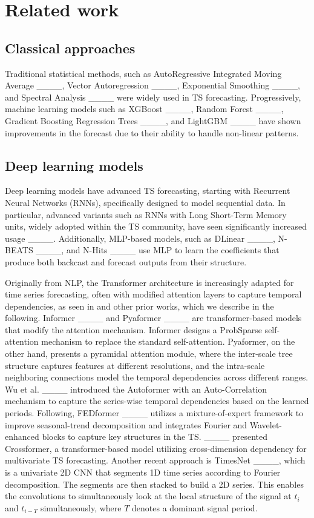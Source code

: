 \section{Related work}
\label{sec:related_work}

\subsection{Classical approaches}
Traditional statistical methods, such as AutoRegressive Integrated Moving Average ____, Vector Autoregression ____, Exponential Smoothing ____, and Spectral Analysis ____ were widely used in TS forecasting. 
Progressively, machine learning models such as XGBoost ____, Random Forest ____, Gradient Boosting Regression Trees ____, and LightGBM ____ have shown improvements in the forecast due to their ability to handle non-linear patterns.

\subsection{Deep learning models}

Deep learning models have advanced TS forecasting, starting with Recurrent Neural Networks (RNNs), specifically designed to model sequential data.
In particular, advanced variants such as RNNs with Long Short-Term Memory units, widely adopted within the TS community, have seen significantly increased usage ____.
Additionally, MLP-based models, such as DLinear ____, N-BEATS ____, and N-Hits ____ use MLP to learn the coefficients that produce both backcast and forecast outputs from their structure.

Originally from NLP, the Transformer architecture is increasingly adapted for time series forecasting, often with modified attention layers to capture temporal dependencies, as seen in  and other prior works, which we describe in the following.
Informer ____ and Pyaformer ____ are transformer-based models that modify the attention mechanism. 
Informer designs a ProbSparse self-attention mechanism to replace the standard self-attention. 
Pyaformer, on the other hand, presents a pyramidal attention module, where the inter-scale tree structure captures features at different resolutions, and the intra-scale neighboring connections model the temporal dependencies across different ranges.
Wu et al. ____ introduced the Autoformer with an Auto-Correlation mechanism to capture the series-wise temporal dependencies based on the learned periods.
Following, FEDformer ____ utilizes a mixture-of-expert framework to improve seasonal-trend decomposition and integrates Fourier and Wavelet-enhanced blocks to capture key structures in the TS.
____ presented Crossformer, a transformer-based model utilizing cross-dimension dependency for multivariate TS forecasting.
Another recent approach is TimesNet ____, which is a univariate 2D CNN that segments 1D time series according to Fourier decomposition. 
The segments are then stacked to build a 2D series. 
This enables the convolutions to simultaneously look at the local structure of the signal at $t_i$ and $t_{i-T}$ simultaneously, where $T$ denotes a dominant signal period.  


